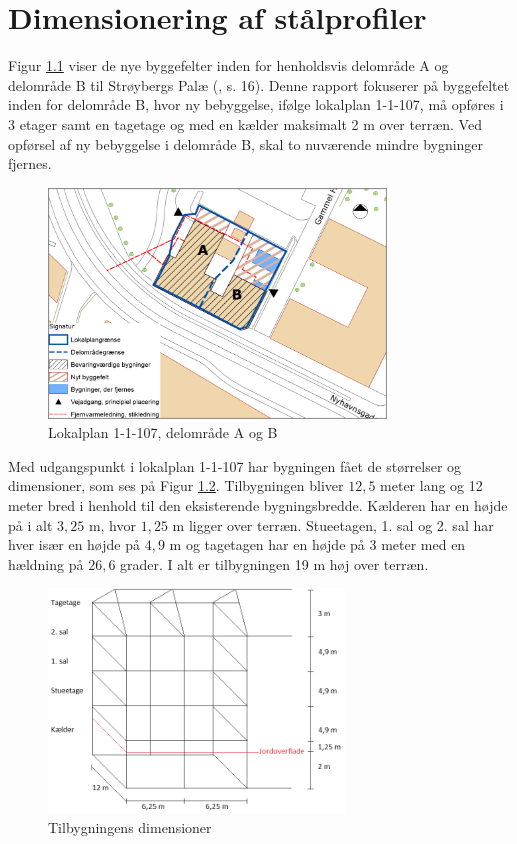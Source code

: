 \chapter{Dimensionering af stålprofiler}

Figur \ref{fig:hej} viser de nye byggefelter inden for henholdsvis delområde A og delområde B til Strøybergs Palæ (\citep{lokalplan}, s. 16). Denne rapport fokuserer på byggefeltet inden for delområde B, hvor ny bebyggelse, ifølge lokalplan 1-1-107, må opføres i 3 etager samt en tagetage og med en kælder maksimalt 2 m over terræn. Ved opførsel af ny bebyggelse i delområde B, skal to nuværende mindre bygninger fjernes. 

\begin{figure}[htbp]
	\centering
	\includegraphics[width=0.8\textwidth]{billeder/signatur.png}
	\caption{Lokalplan 1-1-107, delområde A og B \citep{lokalplan[ bilag 2, s. 35]}}
	\label{fig:hej}
\end{figure}

Med udgangspunkt i lokalplan 1-1-107 har bygningen fået de størrelser og dimensioner, som ses på Figur \ref{fig:farvel}.
\newline \indent{     }  Tilbygningen bliver $12,\!5$ meter lang og 12 meter bred i henhold til den eksisterende bygningsbredde. Kælderen har en højde på i alt $3,\!25$ m, hvor $1,\!25$ m ligger over terræn. Stueetagen, 1. sal og 2. sal har hver især en højde på $4,\!9$ m og tagetagen har en højde på 3 meter med en hældning på $26,\!6$ grader. I alt er tilbygningen 19 m høj over terræn.

\begin{figure}[htbp]
	\centering
	\includegraphics[width=0.7\textwidth]{billeder/tilbygning2.png}
	\caption{Tilbygningens dimensioner}
	\label{fig:farvel}
\end{figure}

